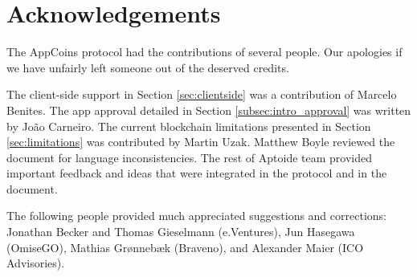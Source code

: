 \section{Acknowledgements}
\label{sec:acknowledgements}

The AppCoins protocol had the contributions of several people. Our apologies if we have unfairly left someone out of the deserved credits.

\medskip

The client-side support in Section \ref{sec:clientside} was a contribution of Marcelo Benites. The app approval detailed in Section \ref{subsec:intro_approval} was written by Jo\~ao Carneiro. The current blockchain limitations presented in Section \ref{sec:limitations} was contributed by Martin Uzak. Matthew Boyle reviewed the document for language inconsistencies. The rest of Aptoide team provided important feedback and ideas that were integrated in the protocol and in the document.

\medskip

The following people provided much appreciated suggestions and corrections: Jonathan Becker and Thomas Gieselmann (e.Ventures), Jun Hasegawa (OmiseGO), Mathias Gr{\o}nneb{\ae}k (Braveno), and Alexander Maier (ICO Advisories).
